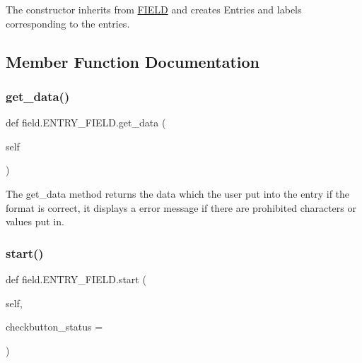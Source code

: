 The constructor inherits from \hyperlink{classfield_1_1FIELD}{F\+I\+E\+LD} and creates Entries and labels corresponding to the entries. 



\subsection{Member Function Documentation}
\mbox{\label{classfield_1_1ENTRY__FIELD_a507d037b7c07b2da5c7d344e20d32fac}} 
\subsubsection{\texorpdfstring{get\+\_\+data()}{get\_data()}}
{\footnotesize\ttfamily def field.\+E\+N\+T\+R\+Y\+\_\+\+F\+I\+E\+L\+D.\+get\+\_\+data (\begin{DoxyParamCaption}\item[{}]{self }\end{DoxyParamCaption})}



The get\+\_\+data method returns the data which the user put into the entry if the format is correct, it displays a error message if there are prohibited characters or values put in. 

\mbox{\label{classfield_1_1ENTRY__FIELD_ae2e9fcabf60c2a2865bff3de226e97a3}} 
\subsubsection{\texorpdfstring{start()}{start()}}
{\footnotesize\ttfamily def field.\+E\+N\+T\+R\+Y\+\_\+\+F\+I\+E\+L\+D.\+start (\begin{DoxyParamCaption}\item[{}]{self,  }\item[{}]{checkbutton\+\_\+status = {} }\end{DoxyParamCaption})}



